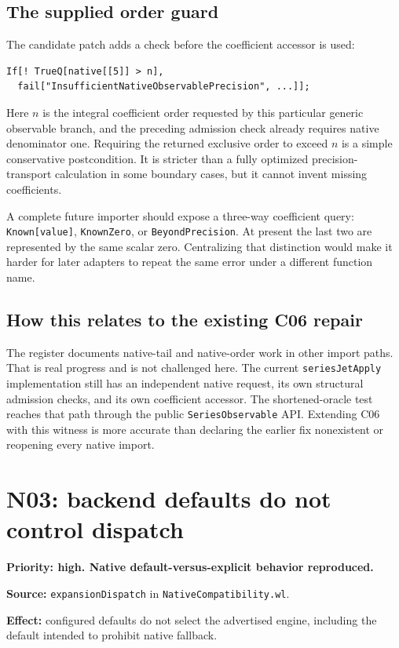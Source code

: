 \documentclass[11pt,letterpaper]{article}
\newcommand{\code}[1]{\nolinkurl{#1}}
\begin{document}
\subsection{The supplied order guard}
The candidate patch adds a check before the coefficient accessor is used:
\begin{lstlisting}
If[! TrueQ[native[[5]] > n],
  fail["InsufficientNativeObservablePrecision", ...]];
\end{lstlisting}
Here $n$ is the integral coefficient order requested by this particular generic
observable branch, and the preceding admission check already requires native
denominator one. Requiring the returned exclusive order to exceed $n$ is a
simple conservative postcondition. It is stricter than a fully optimized
precision-transport calculation in some boundary cases, but it cannot invent
missing coefficients.

A complete future importer should expose a three-way coefficient query:
\code{Known[value]}, \code{KnownZero}, or \code{BeyondPrecision}. At present the
last two are represented by the same scalar zero. Centralizing that distinction
would make it harder for later adapters to repeat the same error under a
different function name.

\subsection{How this relates to the existing C06 repair}
The register documents native-tail and native-order work in other import paths.
That is real progress and is not challenged here. The current
\code{seriesJetApply} implementation still has an independent native request,
its own structural admission checks, and its own coefficient accessor. The
shortened-oracle test reaches that path through the public
\code{SeriesObservable} API. Extending C06 with this witness is more accurate
than declaring the earlier fix nonexistent or reopening every native import.
\cite{register,operations}

\section{N03: backend defaults do not control dispatch}\label{sec:n03}
\begin{findingbox}
\textbf{Priority: high. Native default-versus-explicit behavior reproduced.}\par
\textbf{Source:} \code{expansionDispatch} in \code{NativeCompatibility.wl}.\par
\textbf{Effect:} configured defaults do not select the advertised engine,
including the default intended to prohibit native fallback.
\end{findingbox}
\end{document}

